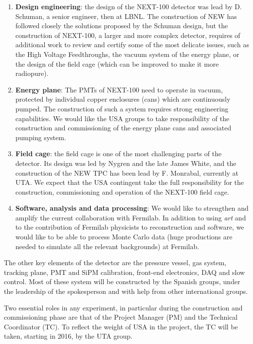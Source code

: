 \begin{enumerate}
\item {\bf Design engineering}: the design of the NEXT-100 detector was lead by D. Schuman, a senior engineer, then at LBNL. The construction of NEW has followed closely the solutions proposed by the Schuman design, but the construction of NEXT-100, a larger and more complex detector, requires of additional work to review and certify some of the most delicate issues, such as the High Voltage Feedthroughs, the vacuum system of the energy plane, or the design of the field cage (which can be improved to make it more radiopure). 
\item {\bf Energy plane}: The PMTs of NEXT-100 need to operate in vacuum, protected by individual copper enclosures (cans) which are continuously pumped. The construction of such a system requires strong engineering capabilities. We would like the USA groups to take responsibility of the construction and commissioning of the energy plane cans and associated pumping system.  
\item {\bf Field cage}: the field cage is one of the most challenging parts of the detector. Its design was led by Nygren and the late James White, and the construction of the NEW TPC has been lead by F. Monrabal, currently at UTA. We expect that the USA contingent take the full responsibility for the construction, commissioning and operation of the NEXT-100 field cage. 
\item {\bf Software, analysis and data processing}: We would like to strengthen and amplify the current collaboration with Fermilab. In addition to using {\em art} and to the contribution of Fermilab physicists to reconstruction and software, we would like to be able to process Monte Carlo data (huge productions are needed to simulate all the relevant backgrounds) at Fermilab. 
\end{enumerate}

The other key elements of the detector are the pressure vessel, gas system, tracking plane, PMT and SiPM calibration, front-end electronics, DAQ and slow control. Most of these system will be constructed by the Spanish groups, under the leadership of the spokesperson and with help from other international groups. 

Two essential roles in any experiment, in particular during the construction and commissioning phase are that of the Project Manager (PM) and the Technical Coordinator (TC). To reflect the weight of USA in the project, the TC will be taken, starting in 2016, by the UTA group. 
 
